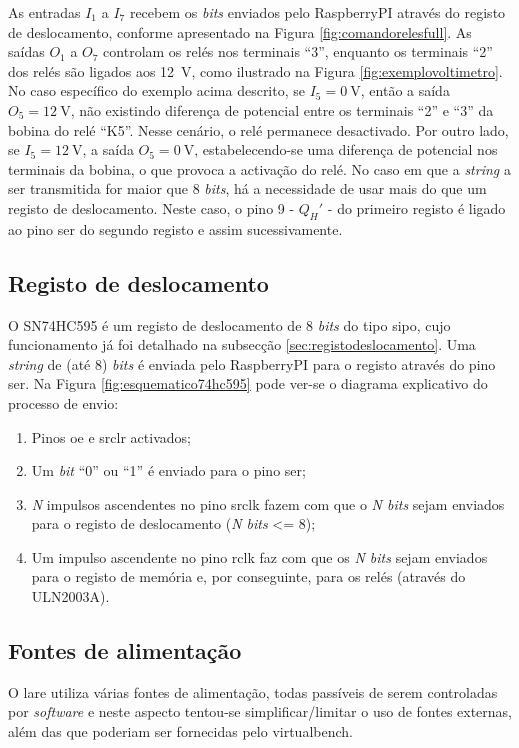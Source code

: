 As entradas $I_{1}$ a $I_{7}$ recebem os \textit{bits} enviados pelo \gls{RaspberryPI} através do registo de deslocamento, conforme apresentado na Figura \ref{fig:comandorelesfull}. As saídas $O_{1}$ a $O_{7}$ controlam os relés nos terminais ``3'', enquanto os terminais ``2'' dos relés são ligados aos \SI{12}{\volt}, como ilustrado na Figura \ref{fig:exemplovoltimetro}. No caso específico do exemplo acima descrito, se $I_{5} = \SI{0}{\volt}$, então a saída $O_{5} = \SI{12}{\volt}$, não existindo diferença de potencial entre os terminais ``2'' e ``3'' da bobina do relé ``K5''. Nesse cenário, o relé permanece desactivado. Por outro lado, se $I_{5} = \SI{12}{\volt}$, a saída $O_{5} = \SI{0}{\volt}$, estabelecendo-se uma diferença de potencial nos terminais da bobina, o que provoca a activação do relé. No caso em que a \textit{string} a ser transmitida for maior que 8 \textit{bits}, há a necessidade de usar mais do que um registo de deslocamento. Neste caso, o pino 9 - $Q_{H}'$ - do primeiro registo é ligado ao pino \acrshort{ser} do segundo registo e assim sucessivamente.

\subsection{Registo de deslocamento}
\label{sec:hwregistodeslocamento}
O SN74HC595 é um registo de deslocamento de 8 \textit{bits} do tipo \acrshort{sipo}, cujo funcionamento já foi detalhado na subsecção \ref{sec:registodeslocamento}. Uma \textit{string} de (até 8) \textit{bits} é enviada pelo \gls{RaspberryPI} para o registo através do pino \acrshort{ser}. Na Figura \ref{fig:esquematico74hc595} pode ver-se o diagrama explicativo do processo de envio:

\begin{enumerate}
	\item Pinos \acrshort{oe} e \acrshort{srclr} activados;
	\item Um \textit{bit} ``0'' ou ``1'' é enviado para o pino \acrshort{ser};
	\item \textit{N} impulsos ascendentes no pino \acrshort{srclk} fazem com que o \textit{N bits} sejam enviados para o registo de deslocamento (\textit{N bits} <= 8);
	\item Um impulso ascendente no pino \acrshort{rclk} faz com que os \textit{N bits} sejam enviados para o registo de memória e, por conseguinte, para os relés (através do ULN2003A).
\end{enumerate}

\subsection{Fontes de alimentação}
\label{sec:fontesalimentacao}
O \acrshort{lare} utiliza várias fontes de alimentação, todas passíveis de serem controladas por \textit{software} e neste aspecto tentou-se simplificar/limitar o uso de fontes externas, além das que poderiam ser fornecidas pelo \acrshort{virtualbench}. 

